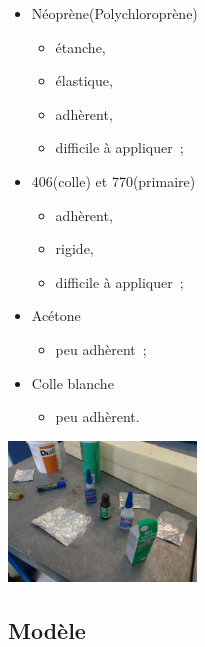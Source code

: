 \documentclass{beamer}
\begin{document}
\begin{frame}
  \begin{multicols}{2}
    \begin{itemize}
      \item Néoprène(Polychloroprène)
      \begin{itemize}
        \item étanche,
        \item élastique,
        \item adhèrent,
        \item difficile à appliquer~;
      \end{itemize}
      \item 406(colle) et 770(primaire)
      \begin{itemize}
        \item adhèrent,
        \item rigide,
        \item difficile à appliquer~;
      \end{itemize}
      \item Acétone
      \begin{itemize}
        \item peu adhèrent~;
      \end{itemize}
      \item Colle blanche
      \begin{itemize}
        \item peu adhèrent.
      \end{itemize}
    \end{itemize}
    \newpage
    \begin{center}
      \includegraphics[width=5cm]{../Images/colle2.jpg}
    \end{center}
  \end{multicols}
\end{frame}

\subsection{Modèle}
\end{document}
